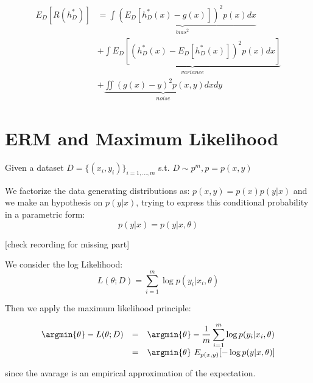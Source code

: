 $$
\begin{array}{rl}
E_D[R(h^*_D)]
& = \underbrace{\int ( E_D[h^*_D(x) - g(x)])^2 p(x) dx}_{bias^2} \\
& + \underbrace{\int E_D[(h^*_D(x) - E_D[h^*_D(x)])^2 p(x) dx]}_{variance} \\
& + \underbrace{\iint (g(x) - y)^2 p(x,y) dx dy}_{noise}
\end{array}
$$

\section{ERM and Maximum Likelihood}

Given a dataset $D = \{(x_i, y_i)\}_{i=1, \dots, m}$ s.t. $D \sim p^m, p = p(x,y)$

We factorize the data generating distributions as: $p(x,y) = p(x) p(y|x)$ and we make an hypothesis on $p(y|x)$, trying to express this conditional probability in a parametric form:
$$p(y|x) = p(y|x, \theta)$$

[check recording for missing part]

We consider the log Likelihood:
$$
L(\theta; D) = \sum_{i = 1}^m \log p(y_i | x_i, \theta)
$$

Then we apply the maximum likelihood principle:

$$
\begin{array}{rcl}
    \argmin{\theta} - L(\theta; D) &
    = & \argmin{\theta} - \dfrac 1m \displaystyle\sum_{i=1}^m \log p(y_i | x_i, \theta) \\
    & = & \argmin{\theta}\ E_{p(x,y)}[-\log p(y | x, \theta)]
\end{array}
$$

since the avarage is an empirical approximation of the expectation.